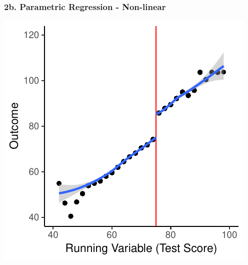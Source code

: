 \documentclass[xcolor=x11names,compress]{beamer}\usepackage[]{graphicx}\usepackage[]{color}
\makeatletter
\def\maxwidth{ %
  \ifdim\Gin@nat@width>\linewidth
    \linewidth
  \else
    \Gin@nat@width
  \fi
}
\newenvironment{knitrout}{}{} %
\renewcommand{\(}{\begin{columns}}
\renewcommand{\)}{\end{columns}}
\newcommand{\<}[1]{\begin{column}{#1}}
\renewcommand{\>}{\end{column}}
\makeatother
\begin{document}
\begin{frame}
\frametitle{2b. Parametric Regression - Non-linear}
\begin{center}
\begin{knitrout}
\color{fgcolor}
\includegraphics[width=\maxwidth]{figure/chart5-1} 

\end{knitrout}
\end{center}
\end{frame}
\end{document}
